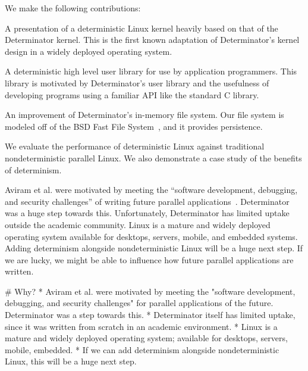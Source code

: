 \fi

We make the following contributions:
\begin{myitemize4}
    \item A presentation of a deterministic Linux kernel heavily based on that
    of the Determinator kernel. This is the first known adaptation of
    Determinator's kernel design in a widely deployed operating system.
    \item A deterministic high level user library for use by application
    programmers. This library is motivated by Determinator's user library and
    the usefulness of developing programs using a familiar API like the standard
    C library.
    \item An improvement of Determinator's in-memory file system. Our file
    system is modeled off of the BSD Fast File System~\cite{mckusick1984fast},
    and it provides persistence.
    \item We evaluate the performance of deterministic Linux against traditional
    nondeterministic parallel Linux. We also demonstrate a case study of the
    benefits of determinism.
\end{myitemize4}

\iffalse

# Contributions
* We make the following contributions:
* The first known adaptation of Determinator's design to a widely deployed OS.
* A high-level user library for application developers, similar to
  Determinator's user library.
* An improvement of Determinator's in-memory file system based on BSD Fast
  file system.
* An evaluation of deterministic Linux against legacy nondeterministic Linux and
  a case study of deterministic execution's benefits.

\fi

Aviram et al. were motivated by meeting the ``software development, debugging,
and security challenges'' of writing future parallel
applications~\cite{Aviram10}. Determinator was a huge step towards this.
Unfortunately, Determinator has limited uptake outside the academic community.
Linux is a mature and widely deployed operating system available for desktops,
servers, mobile, and embedded systems. Adding determinism alongside
nondeterministic Linux will be a huge next step. If we are lucky, we might be
able to influence how future parallel applications are written.

\iffalse

# Why?
* Aviram et al. were motivated by meeting the "software development, debugging,
  and security challenges" for parallel applications of the future. Determinator
  was a step towards this.
* Determinator itself has limited uptake, since it was written from scratch in
  an academic environment.
* Linux is a mature and widely deployed operating system; available for
  desktops, servers, mobile, embedded.
* If we can add determinism alongside nondeterministic Linux, this will be a
  huge next step.

